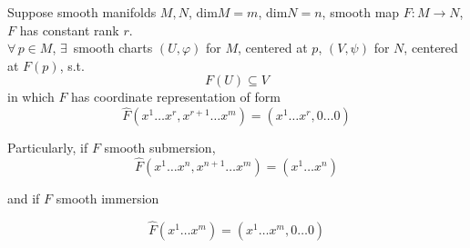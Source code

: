 \begin{theorem}
Suppose smooth manifolds $M, N$, $\text{dim}{M} = m$, $\text{dim}{N} = n$, smooth map $F:M \to N$, $F$ has constant rank $r$. \\
$\forall \, p \in M$, $\exists \, $ smooth charts $(U, \varphi)$ for $M$, centered at $p$, $(V, \psi)$ for $N$, centered at $F(p)$, s.t. 
\[
F(U) \subseteq V
\]
in which $F$ has coordinate representation of form
\begin{equation}
\widehat{F}(x^1 \dots x^r, x^{r+1} \dots x^m) = (x^1 \dots x^r , 0 \dots 0)
\end{equation}

Particularly, if $F$ smooth submersion,
\[
\widehat{F}(x^1 \dots x^n, x^{n+1} \dots x^m) = (x^1 \dots x^n)
\]

and if $F$ smooth immersion

\[
\widehat{F}(x^1 \dots x^m ) = (x^1 \dots x^m , 0 \dots 0)
\]
\end{theorem}

